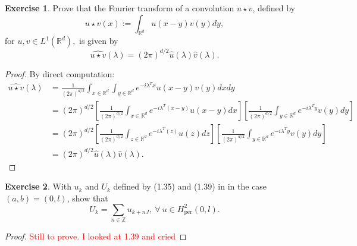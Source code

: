 \documentclass{amsart}
\theoremstyle{plain}
\theoremstyle{definition}
\newtheorem{exer}{Exercise}[section]
\newcommand{\R}{\mathbb{R}}
\newcommand{\Z}{\mathbb{Z}}
\newcommand{\tcr}[1]{\textcolor{red}{#1}}
\begin{document}
\begin{exer}
     Prove that the Fourier transform of a convolution $u\star v$, defined by
    $$u\star v(x)  := \int_{\R^d} u(x-y)v(y) dy,$$
    for $u,v \in L^1(\R^d),$ is given by 
    $$\widehat{u\star v}(\lambda) = \left(2\pi\right)^{d/2} \widehat{u}(\lambda)\widehat{v}(\lambda).$$
\end{exer}
\begin{proof}
By direct computation:
\begin{align*}
    \widehat{u\star v}(\lambda)&= \frac{1}{\left(2\pi\right)^{d/2}}\int_{x\in \R^d} \int_{y \in \R^d} e^{-i\lambda^T x} u(x-y)v(y) dx dy\\
    &= \left(2\pi\right)^{d/2}\left[ \frac{1}{\left(2\pi\right)^{d/2}}\int_{x\in \R^d} e^{-i\lambda^T (x-y)}u(x-y) dx \right]\left[ \frac{1}{\left(2\pi\right)^{d/2}}\int_{y\in \R^d} e^{-i\lambda^T y}v(y) dy\right]\\
    &= \left(2\pi\right)^{d/2}\left[ \frac{1}{\left(2\pi\right)^{d/2}}\int_{z\in \R^d} e^{-i\lambda^T (z)}u(z) dz \right]\left[ \frac{1}{\left(2\pi\right)^{d/2}}\int_{y\in \R^d} e^{-i\lambda^T y}v(y) dy\right]\\
    &= {\left(2\pi\right)^{d/2}}\widehat{u}(\lambda)\widehat{v}(\lambda).
\end{align*}    
\end{proof}

\begin{exer}
\label{Exercise 1.22}
With $u_k$ and $U_k$ defined by (1.35) and (1.39) in \cite{lord2014introduction} in the case $(a,b) =(0,l)$, show that
$$U_k = \sum_{n\in \Z} u_{k+nJ}, \ \forall \ u\in H^2_{\text{per}}(0,l).$$
\end{exer}
\begin{proof}
    \tcr{Still to prove. I looked at 1.39 and cried}
\end{proof}
\end{document}
